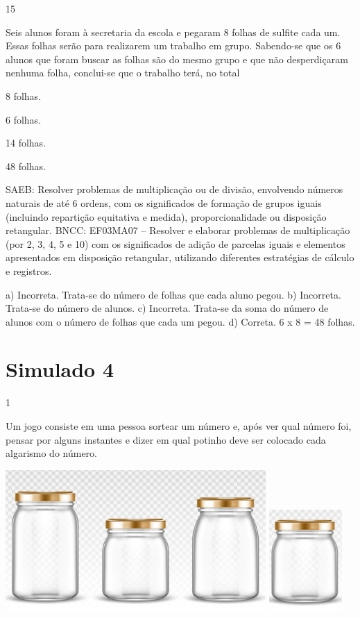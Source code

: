 \begin{multicols}{2}
{\begin{escolha}
{\num{15}

Seis alunos foram à secretaria da escola e pegaram 8 folhas de sulfite cada um. Essas folhas serão para realizarem um trabalho em grupo. Sabendo-se que os 6 alunos que foram buscar as folhas são do mesmo grupo
e que não desperdiçaram nenhuma folha, conclui-se que o trabalho terá, no total

\begin{escolha}

\item
  8 folhas.
\item
  6 folhas.
\item
  14 folhas.
\item
  48 folhas.
\end{escolha}

SAEB: Resolver problemas de multiplicação ou de divisão, envolvendo números naturais de até 6 ordens, com os significados de formação de grupos iguais (incluindo repartição equitativa e medida), proporcionalidade ou disposição retangular.
BNCC: EF03MA07 – Resolver e elaborar problemas de multiplicação (por 2, 3, 4, 5 e 10) com os
significados de adição de parcelas iguais e elementos apresentados em disposição retangular,
utilizando diferentes estratégias de cálculo e registros.

a) Incorreta. Trata-se do número de folhas que cada aluno pegou.
b) Incorreta. Trata-se do número de alunos.
c) Incorreta. Trata-se da soma do número de alunos com o número de folhas que cada um pegou.
d) Correta. 6 x 8 = 48 folhas.

\chapter{Simulado 4}

\num{1}

Um jogo consiste em uma pessoa sortear um número e, após ver qual número foi, pensar por alguns instantes e dizer em qual potinho deve ser colocado cada algarismo do número.

\includegraphics[width=3.90833in,height=2.14168in]{media/image129.png}
\includegraphics[width=1.10010in,height=1.54180in]{media/image130.png}

}
\end{escolha}}
\end{multicols}

